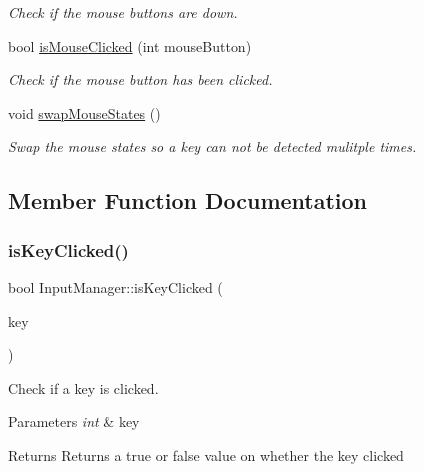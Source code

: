 \begin{DoxyCompactItemize}
\begin{DoxyCompactList}\small\item\em Check if the mouse buttons are down. \end{DoxyCompactList}\item 
bool \hyperlink{class_input_manager_aac8742d42b5444c2e6684c47e0184a79}{is\+Mouse\+Clicked} (int mouse\+Button)
\begin{DoxyCompactList}\small\item\em Check if the mouse button has been clicked. \end{DoxyCompactList}\item 
\mbox{\label{class_input_manager_a852f468d2729d566eb46155f83bbadf6}} 
void \hyperlink{class_input_manager_a852f468d2729d566eb46155f83bbadf6}{swap\+Mouse\+States} ()
\begin{DoxyCompactList}\small\item\em Swap the mouse states so a key can not be detected mulitple times. \end{DoxyCompactList}\end{DoxyCompactItemize}


\subsection{Member Function Documentation}
\mbox{\label{class_input_manager_ac75729c5eb7759a75d75f33aae910a13}} 
\subsubsection{\texorpdfstring{is\+Key\+Clicked()}{isKeyClicked()}}
{\footnotesize\ttfamily bool Input\+Manager\+::is\+Key\+Clicked (\begin{DoxyParamCaption}\item[{int}]{key }\end{DoxyParamCaption})}



Check if a key is clicked. 


\begin{DoxyParams}{Parameters}
{\em int} & key \\
\hline
\end{DoxyParams}
\begin{DoxyReturn}{Returns}
Returns a true or false value on whether the key clicked 
\end{DoxyReturn}
\mbox{\label{class_input_manager_a3a37bcfcd6428195120610fce9a68b7c}} 
